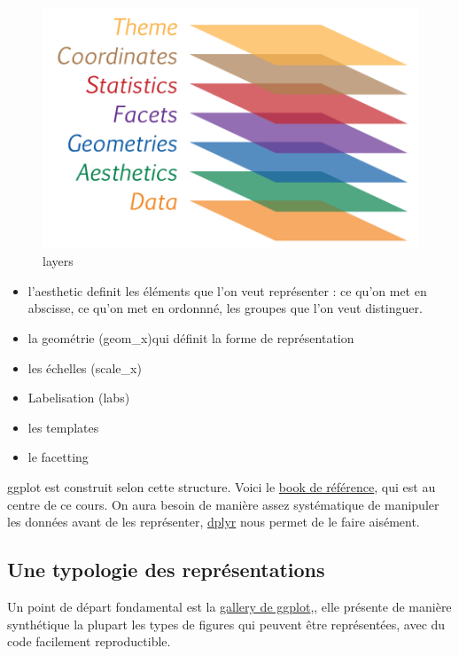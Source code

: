 \documentclass[
]{book}
\providecommand{\tightlist}{%
  \setlength{\itemsep}{0pt}\setlength{\parskip}{0pt}}
\begin{document}
\begin{figure}
\centering
\includegraphics{./Images/graphiclayers.png}
\caption{layers}
\end{figure}

\begin{itemize}
\tightlist
\item
  l'aesthetic definit les éléments que l'on veut représenter : ce qu'on met en abscisse, ce qu'on met en ordonnné, les groupes que l'on veut distinguer.
\item
  la geométrie (geom\_x)qui définit la forme de représentation
\item
  les échelles (scale\_x)
\item
  Labelisation (labs)
\item
  les templates
\item
  le facetting
\end{itemize}

ggplot est construit selon cette structure. Voici le \href{https://ggplot2-book.org/}{book de référence}, qui est au centre de ce cours. On aura besoin de manière assez systématique de manipuler les données avant de les représenter, \href{http://larmarange.github.io/analyse-R/manipuler-les-donnees-avec-dplyr.html}{dplyr} nous permet de le faire aisément.

\hypertarget{une-typologie-des-repruxe9sentations}{%
\subsection{Une typologie des représentations}\label{une-typologie-des-repruxe9sentations}}

Un point de départ fondamental est la \href{https://www.r-graph-gallery.com/}{gallery de ggplot},, elle présente de manière synthétique la plupart les types de figures qui peuvent être représentées, avec du code facilement reproductible.
\end{document}
